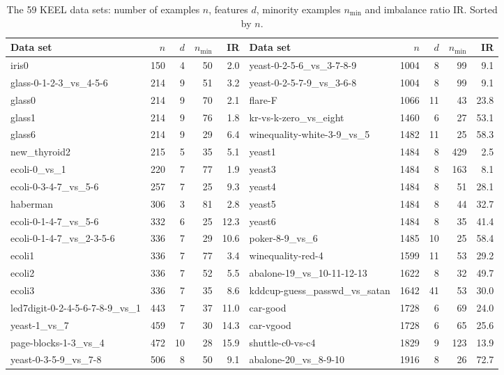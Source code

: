 \begin{table}[t]
\centering
\caption{The 59 KEEL data sets: number of examples $n$, features $d$, minority examples $n_{\min}$ and imbalance ratio IR. Sorted by $n$.}
\label{tab:datalist}
\scriptsize
\setlength{\tabcolsep}{3pt}
\begin{tabular}{@{}lrrrr@{\hspace{14pt}}lrrrr@{}}
\toprule
Data set & $n$ & $d$ & $n_{\min}$ & IR & Data set & $n$ & $d$ & $n_{\min}$ & IR \\
\midrule
iris0 & 150 & 4 & 50 & 2.0 & yeast-0-2-5-6\_vs\_3-7-8-9 & 1004 & 8 & 99 & 9.1 \\
glass-0-1-2-3\_vs\_4-5-6 & 214 & 9 & 51 & 3.2 & yeast-0-2-5-7-9\_vs\_3-6-8 & 1004 & 8 & 99 & 9.1 \\
glass0 & 214 & 9 & 70 & 2.1 & flare-F & 1066 & 11 & 43 & 23.8 \\
glass1 & 214 & 9 & 76 & 1.8 & kr-vs-k-zero\_vs\_eight & 1460 & 6 & 27 & 53.1 \\
glass6 & 214 & 9 & 29 & 6.4 & winequality-white-3-9\_vs\_5 & 1482 & 11 & 25 & 58.3 \\
new\_thyroid2 & 215 & 5 & 35 & 5.1 & yeast1 & 1484 & 8 & 429 & 2.5 \\
ecoli-0\_vs\_1 & 220 & 7 & 77 & 1.9 & yeast3 & 1484 & 8 & 163 & 8.1 \\
ecoli-0-3-4-7\_vs\_5-6 & 257 & 7 & 25 & 9.3 & yeast4 & 1484 & 8 & 51 & 28.1 \\
haberman & 306 & 3 & 81 & 2.8 & yeast5 & 1484 & 8 & 44 & 32.7 \\
ecoli-0-1-4-7\_vs\_5-6 & 332 & 6 & 25 & 12.3 & yeast6 & 1484 & 8 & 35 & 41.4 \\
ecoli-0-1-4-7\_vs\_2-3-5-6 & 336 & 7 & 29 & 10.6 & poker-8-9\_vs\_6 & 1485 & 10 & 25 & 58.4 \\
ecoli1 & 336 & 7 & 77 & 3.4 & winequality-red-4 & 1599 & 11 & 53 & 29.2 \\
ecoli2 & 336 & 7 & 52 & 5.5 & abalone-19\_vs\_10-11-12-13 & 1622 & 8 & 32 & 49.7 \\
ecoli3 & 336 & 7 & 35 & 8.6 & kddcup-guess\_passwd\_vs\_satan & 1642 & 41 & 53 & 30.0 \\
led7digit-0-2-4-5-6-7-8-9\_vs\_1 & 443 & 7 & 37 & 11.0 & car-good & 1728 & 6 & 69 & 24.0 \\
yeast-1\_vs\_7 & 459 & 7 & 30 & 14.3 & car-vgood & 1728 & 6 & 65 & 25.6 \\
page-blocks-1-3\_vs\_4 & 472 & 10 & 28 & 15.9 & shuttle-c0-vs-c4 & 1829 & 9 & 123 & 13.9 \\
yeast-0-3-5-9\_vs\_7-8 & 506 & 8 & 50 & 9.1 & abalone-20\_vs\_8-9-10 & 1916 & 8 & 26 & 72.7 \\

\end{tabular}
\end{table}
